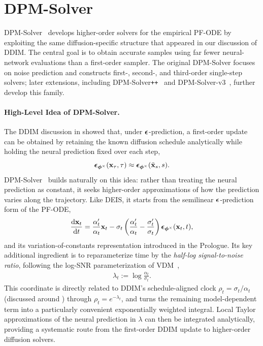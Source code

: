 \clearpage
\newpage



\section{\texorpdfstring{DPM-Solver}{DPM-Solver}}\label{sec:dpm}

DPM-Solver~\citep{lu2022dpm} develops higher-order solvers for the empirical
PF-ODE by exploiting the same diffusion-specific structure that appeared in
our discussion of DDIM. The central goal is to obtain accurate samples using
far fewer neural-network evaluations than a first-order sampler. The original
DPM-Solver focuses on noise prediction and constructs first-, second-, and
third-order single-step solvers; later extensions, including
DPM-Solver\texttt{++}~\citep{lu2022dpm2} and
DPM-Solver-v3~\citep{zheng2023dpm}, further develop this family.

\paragraph{High-Level Idea of DPM-Solver.}
The DDIM discussion in  showed that, under
${\bm{\epsilon}}$-prediction, a first-order update can be obtained by retaining the
known diffusion schedule analytically while holding the neural prediction
fixed over each step,
\[
{\bm{\epsilon}}_{\bm{\phi}^\times}({\mathbf{x}}_\tau,\tau)
\approx
{\bm{\epsilon}}_{\bm{\phi}^\times}(\tilde{{\mathbf{x}}}_s,s).
\]
DPM-Solver~\citep{lu2022dpm} builds naturally on this idea: rather than
treating the neural prediction as constant, it seeks higher-order
approximations of how the prediction varies along the trajectory. Like DEIS,
it starts from the semilinear ${\bm{\epsilon}}$-prediction form of the PF-ODE,
\begin{align}
\label{eq:noise-alpha-sigma}
\frac{\mathop{}\!\mathrm{d} {\mathbf{x}}_t}{\mathop{}\!\mathrm{d} t}
=
\frac{\alpha_t'}{\alpha_t}{\mathbf{x}}_t
-
\sigma_t
\left(
\frac{\alpha_t'}{\alpha_t}
-
\frac{\sigma_t'}{\sigma_t}
\right)
{\bm{\epsilon}}_{{\bm{\phi}}^\times}({\mathbf{x}}_t,t),
\end{align}
and its variation-of-constants representation introduced in the Prologue.
Its key additional ingredient is to reparameterize time by the
\emph{half-log signal-to-noise ratio}, following the log-SNR
parameterization of VDM~\citep{kingma2021variational},
\begin{align}
\label{eq:lambda}
\lambda_t
:=
\log\frac{\alpha_t}{\sigma_t}.
\end{align}
This coordinate is directly related to DDIM's schedule-aligned clock
$\rho_t=\sigma_t/\alpha_t$ (discussed around ) through $\rho_t=e^{-\lambda_t}$, and turns the
remaining model-dependent term into a particularly convenient exponentially
weighted integral. Local Taylor approximations of the neural prediction in
$\lambda$ can then be integrated analytically, providing a systematic route
from the first-order DDIM update to higher-order diffusion solvers.


